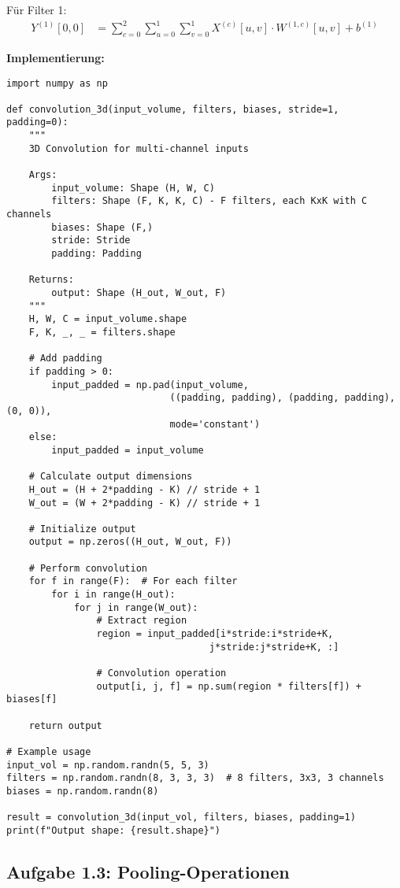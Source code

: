 ﻿\documentclass[12pt,a4paper]{article}
\begin{document}
Für Filter 1:
\begin{align}
Y^{(1)}[0,0] &= \sum_{c=0}^{2} \sum_{u=0}^{1} \sum_{v=0}^{1} X^{(c)}[u,v] \cdot W^{(1,c)}[u,v] + b^{(1)}
\end{align}

\textbf{Implementierung:}

\begin{lstlisting}
import numpy as np

def convolution_3d(input_volume, filters, biases, stride=1, padding=0):
    """
    3D Convolution for multi-channel inputs
    
    Args:
        input_volume: Shape (H, W, C)
        filters: Shape (F, K, K, C) - F filters, each KxK with C channels
        biases: Shape (F,)
        stride: Stride
        padding: Padding
    
    Returns:
        output: Shape (H_out, W_out, F)
    """
    H, W, C = input_volume.shape
    F, K, _, _ = filters.shape
    
    # Add padding
    if padding > 0:
        input_padded = np.pad(input_volume, 
                             ((padding, padding), (padding, padding), (0, 0)), 
                             mode='constant')
    else:
        input_padded = input_volume
    
    # Calculate output dimensions
    H_out = (H + 2*padding - K) // stride + 1
    W_out = (W + 2*padding - K) // stride + 1
    
    # Initialize output
    output = np.zeros((H_out, W_out, F))
    
    # Perform convolution
    for f in range(F):  # For each filter
        for i in range(H_out):
            for j in range(W_out):
                # Extract region
                region = input_padded[i*stride:i*stride+K, 
                                    j*stride:j*stride+K, :]
                
                # Convolution operation
                output[i, j, f] = np.sum(region * filters[f]) + biases[f]
    
    return output

# Example usage
input_vol = np.random.randn(5, 5, 3)
filters = np.random.randn(8, 3, 3, 3)  # 8 filters, 3x3, 3 channels
biases = np.random.randn(8)

result = convolution_3d(input_vol, filters, biases, padding=1)
print(f"Output shape: {result.shape}")
\end{lstlisting}

\subsection{Aufgabe 1.3: Pooling-Operationen}
\end{document}
